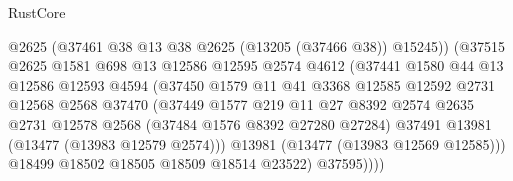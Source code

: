 \begin{lexlean}{RustCore}
\begin{coremodule}
                                      @2625
                                      (@37461 @38 @13 @38 @2625 (@13205 (@37466 @38)) @15245))
                                    (@37515
                                      @2625
                                      @1581
                                      @698
                                      @13
                                      @12586
                                      @12595
                                      @2574
                                      @4612
                                      (@37441
                                        @1580
                                        @44
                                        @13
                                        @12586
                                        @12593
                                        @4594
                                        (@37450
                                          @1579
                                          @11
                                          @41
                                          @3368
                                          @12585
                                          @12592
                                          @2731
                                          @12568
                                          @2568
                                          @37470
                                          (@37449
                                            @1577
                                            @219
                                            @11
                                            @27
                                            @8392
                                            @2574
                                            @2635
                                            @2731
                                            @12578
                                            @2568
                                            (@37484 @1576 @8392 @27280 @27284)
                                            @37491
                                            @13981
                                            (@13477 (@13983 @12579 @2574)))
                                          @13981
                                          (@13477 (@13983 @12569 @12585)))
                                        @18499
                                        @18502
                                        @18505
                                        @18509
                                        @18514
                                        @23522)
                                      @37595))))

\end{coremodule}
\end{lexlean}
